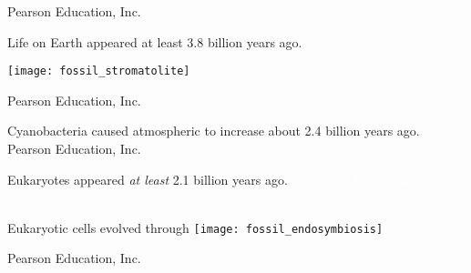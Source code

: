 \documentclass[t]{beamer}
\newcommand{\ccbysa}[1]{%
	\ifx&#1&
	{\textsc{cc by-sa}}%
\else
	{\textsc{cc by-sa #1.0}} 
\fi}
\begin{document}
%
{
\begin{frame}[b]
\hfill \tiny \textcopyright Pearson Education, Inc.
\end{frame}
}
%
\begin{frame}[t]{Life on Earth appeared at least 3.8 billion years ago.}

	\texttt{[image: fossil\_stromatolite]}
	
	\vfilll
	
	\hfill \tiny \textcopyright Pearson Education, Inc.
\end{frame}

{
\begin{frame}[b]{Cyanobacteria caused atmospheric  to increase about 2.4 billion years ago.}
\tiny \textcopyright Pearson Education, Inc.
\end{frame}
}
%
{
\begin{frame}[b]{Eukaryotes appeared \emph{at least} 2.1 billion years ago.}
\tiny \textcolor{white}{Xvazquez, Wikimedia, \ccbysa{2}}
\end{frame}
}
%
\begin{frame}[t]{Eukaryotic cells evolved through }
	\texttt{[image: fossil\_endosymbiosis]}
	
	\vfilll
	
	\hfill \tiny \textcopyright Pearson Education, Inc.
\end{frame}
\end{document}
